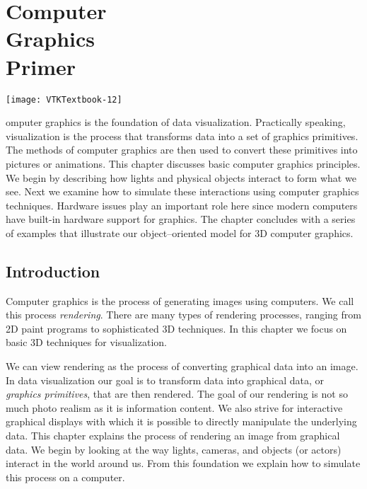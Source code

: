 \chapter[Computer Graphics Primer]{Computer\\ Graphics\\ Primer}
\label{chap:computer_graphics_primer}

\vspace{-11\baselineskip} %
\hfill
 \begin{minipage}{0.5\textwidth}
 \centering
 \texttt{[image: VTKTextbook-12]}
 \end{minipage}
\vspace{2\baselineskip}


omputer graphics is the foundation of data visualization. Practically speaking, visualization is the process that transforms data into a set of graphics primitives. The methods of computer graphics are then used to convert these primitives into pictures or animations. This chapter discusses basic computer graphics principles. We begin by describing how lights and physical objects interact to form what we see. Next we examine how to simulate these interactions using computer graphics techniques. Hardware issues play an important role here since modern computers have built-in hardware support for graphics. The chapter concludes with a series of examples that illustrate our object--oriented model for 3D computer graphics.

\section{Introduction}

Computer graphics is the process of generating images using computers. We call this process \emph{rendering}. There are many types of rendering processes, ranging from 2D paint programs to sophisticated 3D techniques. In this chapter we focus on basic 3D techniques for visualization.

We can view rendering as the process of converting graphical data into an image. In data visualization our goal is to transform data into graphical data, or \emph{graphics primitives}, that are then rendered. The goal of our rendering is not so much photo realism as it is information content. We also strive for interactive graphical displays with which it is possible to directly manipulate the underlying data. This chapter explains the process of rendering an image from graphical data. We begin by looking at the way lights, cameras, and objects (or actors) interact in the world around us. From this foundation we explain how to simulate this process on a computer.

